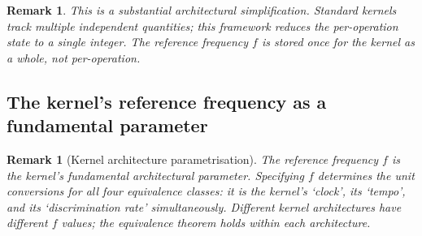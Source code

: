 \documentclass[twocolumn,11pt,a4paper]{article}
\newtheorem{remark}[theorem]{Remark}
\begin{document}
\begin{remark}
This is a substantial architectural simplification. Standard kernels track multiple independent quantities; this framework reduces the per-operation state to a single integer. The reference frequency $f$ is stored once for the kernel as a whole, not per-operation.
\end{remark}

\subsection{The kernel's reference frequency as a fundamental parameter}

\begin{remark}[Kernel architecture parametrisation]
\label{rem:frequency-arch}
The reference frequency $f$ is the kernel's fundamental architectural parameter. Specifying $f$ determines the unit conversions for all four equivalence classes: it is the kernel's `clock', its `tempo', and its `discrimination rate' simultaneously. Different kernel architectures have different $f$ values; the equivalence theorem holds within each architecture.
\end{remark}
\end{document}
